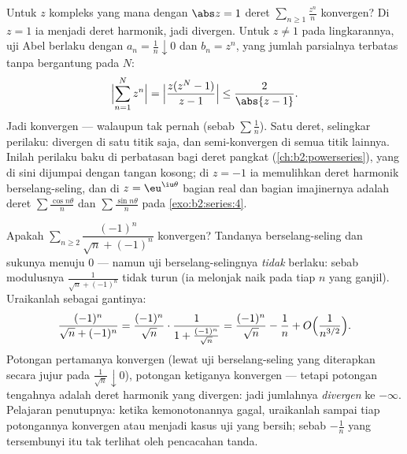 \begin{example}\label{ex:b2:series:abelboundary}
Untuk $z$ kompleks yang mana dengan $\abs z = 1$ deret $\sum_{n \geq 1}
\frac{z^n}{n}$ konvergen? Di $z = 1$ ia menjadi deret harmonik, jadi
divergen. Untuk $z \neq 1$ pada lingkarannya, uji Abel berlaku
dengan $a_n = \frac1n \downarrow 0$ dan $b_n = z^n$, yang jumlah
parsialnya terbatas tanpa bergantung pada $N$:
\[
\Bigl|\sum_{n=1}^{N} z^n\Bigr|
= \Bigl|\frac{z(z^N - 1)}{z - 1}\Bigr|
\leq \frac{2}{\abs{z - 1}} .
\]
Jadi konvergen --- walaupun tak pernah  (sebab $\sum\frac1n$).
Satu deret, selingkar perilaku: divergen di satu titik saja, dan
semi-konvergen di semua titik lainnya. Inilah perilaku baku di
perbatasan bagi deret pangkat (\cref{ch:b2:powerseries}), yang di sini
dijumpai dengan tangan kosong; di $z = -1$ ia memulihkan deret
harmonik berselang-seling, dan di $z = \eu^{\iu\theta}$ bagian real dan
bagian imajinernya adalah deret $\sum\frac{\cos
n\theta}{n}$ dan $\sum\frac{\sin n\theta}{n}$ pada
\cref{exo:b2:series:4}.
\end{example}

\begin{example}\label{ex:b2:series:trap}
Apakah $\sum_{n\geq2} \dfrac{(-1)^n}{\sqrt n + (-1)^n}$ konvergen?
Tandanya berselang-seling dan sukunya menuju $0$ --- namun
uji berselang-selingnya \emph{tidak} berlaku: sebab modulusnya
$\frac{1}{\sqrt n + (-1)^n}$ tidak turun (ia melonjak naik pada
tiap $n$ yang ganjil). Uraikanlah sebagai gantinya:
\[
\frac{(-1)^n}{\sqrt n + (-1)^n}
= \frac{(-1)^n}{\sqrt n}\cdot
\frac{1}{1 + \frac{(-1)^n}{\sqrt n}}
= \frac{(-1)^n}{\sqrt n} - \frac{1}{n}
+ O\Bigl(\frac{1}{n^{3/2}}\Bigr).
\]
Potongan pertamanya konvergen (lewat uji berselang-seling yang
diterapkan secara jujur pada $\frac1{\sqrt n}\downarrow0$), potongan
ketiganya konvergen  --- tetapi potongan tengahnya adalah deret
harmonik yang divergen: jadi jumlahnya \emph{divergen} ke $-\infty$.
Pelajaran penutupnya: ketika kemonotonannya gagal, uraikanlah sampai tiap
potongannya konvergen  atau menjadi kasus uji yang bersih; sebab
$-\frac1n$ yang tersembunyi itu tak terlihat oleh pencacahan tanda.
\end{example}

